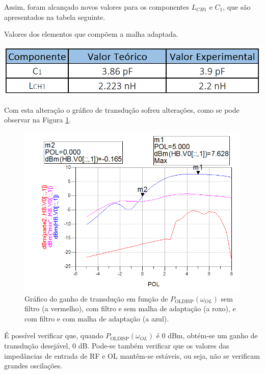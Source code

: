 \documentclass[11pt]{article}
\numberwithin{equation}{section}
\begin{document}
Assim, foram alcançado novos valores para os componentes $L_{CH1}$ e $C_{1}$, que são apresentados na tabela seguinte.

\begin{table}[h]
	\centering
	\caption{Valores dos elementos que compõem a malha adaptada.}
	\vspace{-1.5mm}
	\includegraphics[keepaspectratio=true, scale=0.45]{teoricas/componentes3}
\end{table}

Com esta alteração o gráfico de transdução sofreu alterações, como se pode observar na Figura \ref{fig:GT_21}.

\pagebreak

\begin{figure}[h]
\centering
\includegraphics[keepaspectratio=true, scale=0.45]{exps/GT_21}
\vspace{-0.5em}
\caption{Gráfico do ganho de transdução em função de $ P_{\text{OLDISP}}\left(\omega_{OL}\right) $ sem filtro (a vermelho), com filtro e sem malha de adaptação (a roxo), e com filtro e com malha de adaptação (a azul).}
\vspace{-0.8em}
\label{fig:GT_21}
\end{figure}

É possível verificar que, quando $ P_{\text{OLDISP}}\left(\omega_{OL}\right) $ é 0 dBm, obtém-se um ganho de transdução desejável, 0 dB. Pode-se também verificar que  os valores das impedâncias de entrada de RF e OL mantêm-se estáveis, ou seja, não se verificam grandes oscilações.
\end{document}
